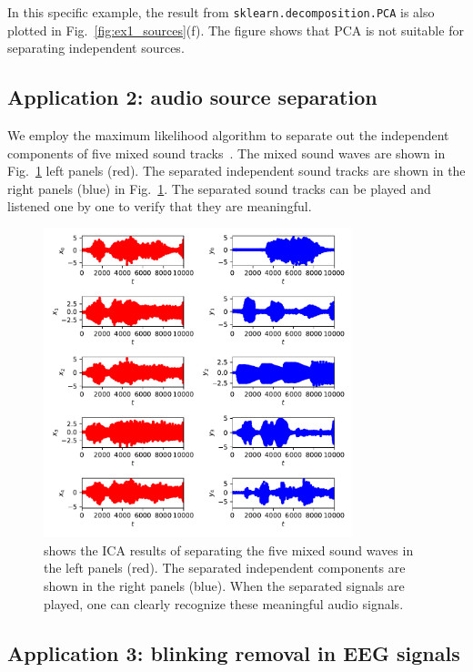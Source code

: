 \documentclass[aps,prl,preprint,superscriptaddress]{revtex4-2}
\begin{document}
In this specific example, the result from \lstinline{sklearn.decomposition.PCA} is also plotted in Fig.~\ref{fig:ex1_sources}(f).
The figure shows that PCA is not suitable for separating independent sources.


\subsection{Application 2: audio source separation}
We employ the maximum likelihood algorithm to separate out the independent components of five mixed sound tracks~\cite{ng_cs229}.
The mixed sound waves are shown in Fig.~\ref{fig:sound} left panels (red).
The separated independent sound tracks are shown in the right panels (blue) in Fig.~\ref{fig:sound}.
The separated sound tracks can be played and listened one by one to verify that they are meaningful.
\begin{figure}[b]
\includegraphics[width=0.8\textwidth]{scripts/sound_example.pdf}
 \caption{\label{fig:sound} shows the ICA results of separating the five mixed sound waves in the left panels (red). The separated independent components are shown in the right panels (blue). When the separated signals are played, one can clearly recognize these meaningful audio signals.}
\end{figure}

\subsection{Application 3: blinking removal in EEG signals}
\end{document}
